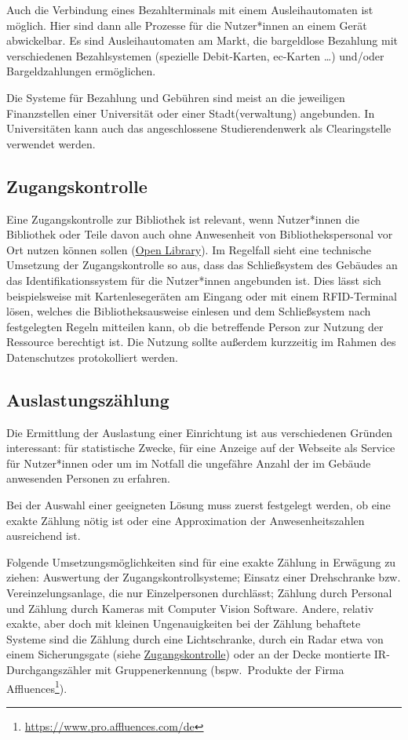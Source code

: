 \documentclass[
  11pt,
  letterpaper,
  DIV=11,
  twoside]{scrreprt}
\DeclareRobustCommand{\href}[2]{#2\footnote{\url{#1}}}
\begin{document}
Auch die Verbindung eines Bezahlterminals mit einem Ausleihautomaten ist
möglich. Hier sind dann alle Prozesse für die Nutzer*innen an einem
Gerät abwickelbar. Es sind Ausleihautomaten am Markt, die bargeldlose
Bezahlung mit verschiedenen Bezahlsystemen (spezielle Debit-Karten,
ec-Karten \ldots) und/oder Bargeldzahlungen ermöglichen.

Die Systeme für Bezahlung und Gebühren sind meist an die jeweiligen
Finanzstellen einer Universität oder einer Stadt(verwaltung) angebunden.
In Universitäten kann auch das angeschlossene Studierendenwerk als
Clearingstelle verwendet werden.

\subsection{Zugangskontrolle}\label{zugangskontrolle}

Eine Zugangskontrolle zur Bibliothek ist relevant, wenn Nutzer*innen die
Bibliothek oder Teile davon auch ohne Anwesenheit von
Bibliothekspersonal vor Ort nutzen können sollen
(\hyperref[open-library]{Open Library}). Im Regelfall sieht eine
technische Umsetzung der Zugangskontrolle so aus, dass das Schließsystem
des Gebäudes an das Identifikationssystem für die Nutzer*innen
angebunden ist. Dies lässt sich beispielsweise mit Kartenlesegeräten am
Eingang oder mit einem RFID-Terminal lösen, welches die
Bibliotheksausweise einlesen und dem Schließsystem nach festgelegten
Regeln mitteilen kann, ob die betreffende Person zur Nutzung der
Ressource berechtigt ist. Die Nutzung sollte außerdem kurzzeitig im
Rahmen des Datenschutzes protokolliert werden.

\subsection{Auslastungszählung}\label{auslastungszuxe4hlung}

Die Ermittlung der Auslastung einer Einrichtung ist aus verschiedenen
Gründen interessant: für statistische Zwecke, für eine Anzeige auf der
Webseite als Service für Nutzer*innen oder um im Notfall die ungefähre
Anzahl der im Gebäude anwesenden Personen zu erfahren.

Bei der Auswahl einer geeigneten Lösung muss zuerst festgelegt werden,
ob eine exakte Zählung nötig ist oder eine Approximation der
Anwesenheitszahlen ausreichend ist.

Folgende Umsetzungsmöglichkeiten sind für eine exakte Zählung in
Erwägung zu ziehen: Auswertung der Zugangskontrollsysteme; Einsatz einer
Drehschranke bzw. Vereinzelungsanlage, die nur Einzelpersonen
durchlässt; Zählung durch Personal und Zählung durch Kameras mit
Computer Vision Software. Andere, relativ exakte, aber doch mit kleinen
Ungenauigkeiten bei der Zählung behaftete Systeme sind die Zählung durch
eine Lichtschranke, durch ein Radar etwa von einem Sicherungsgate (siehe
\hyperref[zugangskontrolle]{Zugangskontrolle}) oder an der Decke
montierte IR-Durchgangszähler mit Gruppenerkennung (bspw.~Produkte der
Firma \href{https://www.pro.affluences.com/de}{Affluences}).
\end{document}

